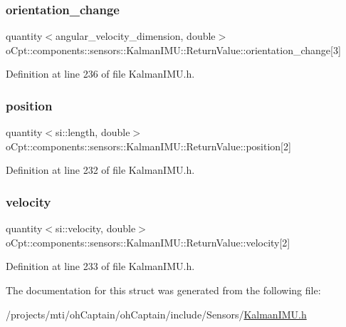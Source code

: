 \subsubsection{\texorpdfstring{orientation\+\_\+change}{orientation\_change}}
{\footnotesize\ttfamily quantity$<$angular\+\_\+velocity\+\_\+dimension, double$>$ o\+Cpt\+::components\+::sensors\+::\+Kalman\+I\+M\+U\+::\+Return\+Value\+::orientation\+\_\+change\mbox{[}3\mbox{]}}



Definition at line 236 of file Kalman\+I\+M\+U.\+h.

\hypertarget{structo_cpt_1_1components_1_1sensors_1_1_kalman_i_m_u_1_1_return_value_abe9309ecd8e15e858e7562d8ecaa97e8}{}\label{structo_cpt_1_1components_1_1sensors_1_1_kalman_i_m_u_1_1_return_value_abe9309ecd8e15e858e7562d8ecaa97e8} 
\subsubsection{\texorpdfstring{position}{position}}
{\footnotesize\ttfamily quantity$<$si\+::length, double$>$ o\+Cpt\+::components\+::sensors\+::\+Kalman\+I\+M\+U\+::\+Return\+Value\+::position\mbox{[}2\mbox{]}}



Definition at line 232 of file Kalman\+I\+M\+U.\+h.

\hypertarget{structo_cpt_1_1components_1_1sensors_1_1_kalman_i_m_u_1_1_return_value_af8ecec3a5160190b61590af45f38aa3b}{}\label{structo_cpt_1_1components_1_1sensors_1_1_kalman_i_m_u_1_1_return_value_af8ecec3a5160190b61590af45f38aa3b} 
\subsubsection{\texorpdfstring{velocity}{velocity}}
{\footnotesize\ttfamily quantity$<$si\+::velocity, double$>$ o\+Cpt\+::components\+::sensors\+::\+Kalman\+I\+M\+U\+::\+Return\+Value\+::velocity\mbox{[}2\mbox{]}}



Definition at line 233 of file Kalman\+I\+M\+U.\+h.



The documentation for this struct was generated from the following file\+:\begin{DoxyCompactItemize}
\item 
/projects/mti/oh\+Captain/oh\+Captain/include/\+Sensors/\hyperlink{_kalman_i_m_u_8h}{Kalman\+I\+M\+U.\+h}\end{DoxyCompactItemize}
